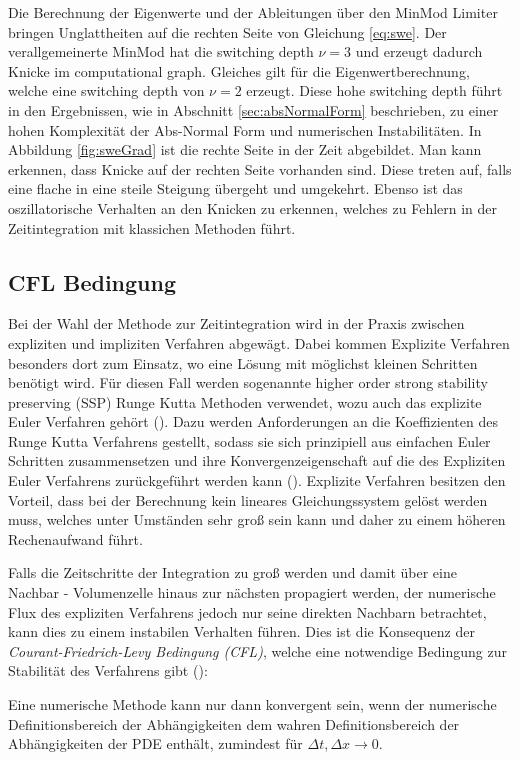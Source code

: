 Die Berechnung der Eigenwerte und der Ableitungen über den MinMod Limiter bringen Unglattheiten auf die rechten Seite von Gleichung \eqref{eq:swe}.  Der verallgemeinerte MinMod hat die switching depth $\nu = 3$ und erzeugt dadurch Knicke im computational graph. Gleiches gilt für die Eigenwertberechnung, welche eine switching depth von $\nu = 2$ erzeugt. Diese hohe switching depth führt in den Ergebnissen, wie in Abschnitt \ref{sec:absNormalForm} beschrieben, zu einer hohen Komplexität der Abs-Normal Form und numerischen Instabilitäten. In Abbildung \ref{fig:sweGrad} ist die rechte Seite in der Zeit abgebildet. Man kann erkennen, dass Knicke auf der rechten Seite vorhanden sind. Diese treten auf, falls eine flache in eine steile Steigung übergeht und umgekehrt. Ebenso ist das oszillatorische Verhalten an den Knicken zu erkennen, welches zu Fehlern in der Zeitintegration mit klassichen Methoden führt.

\subsection{CFL Bedingung}
Bei der Wahl der Methode zur Zeitintegration wird in der Praxis zwischen expliziten und impliziten Verfahren abgewägt. Dabei kommen Explizite Verfahren besonders dort zum Einsatz, wo eine Lösung mit möglichst kleinen Schritten benötigt wird. Für diesen Fall werden sogenannte higher order strong stability preserving (SSP) Runge Kutta Methoden verwendet, wozu auch das explizite Euler Verfahren gehört (\cite{gottlieb2003strong}). Dazu werden Anforderungen an die Koeffizienten des Runge Kutta Verfahrens gestellt, sodass sie sich prinzipiell aus einfachen Euler Schritten zusammensetzen und ihre Konvergenzeigenschaft auf die des Expliziten Euler Verfahrens zurückgeführt werden kann (\cite[Lemma 1.1]{gottlieb2003strong}). Explizite Verfahren besitzen den Vorteil, dass bei der Berechnung kein lineares Gleichungssystem gelöst werden muss, welches unter Umständen sehr groß sein kann und daher zu einem höheren Rechenaufwand führt.

Falls die Zeitschritte der Integration zu groß werden und damit über eine Nachbar - Volumenzelle hinaus zur nächsten propagiert werden, der numerische Flux des expliziten Verfahrens jedoch nur seine direkten Nachbarn betrachtet, kann dies zu einem instabilen Verhalten führen. Dies ist die Konsequenz der \textit{Courant-Friedrich-Levy Bedingung (CFL)}, welche eine notwendige Bedingung zur Stabilität des Verfahrens gibt (\cite[S.69]{leveque2002finite}):
\begin{theorem*}
  Eine numerische Methode kann nur dann konvergent sein, wenn der numerische Definitionsbereich der Abhängigkeiten dem wahren Definitionsbereich der Abhängigkeiten der PDE enthält, zumindest für $\Delta t, \Delta x\to 0$.
\end{theorem*}

